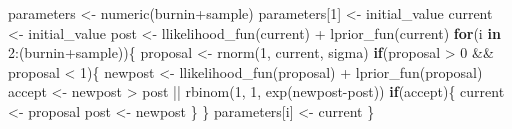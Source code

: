 \documentclass[
  12pt,
]{article}
\newenvironment{Shaded}{\begin{snugshade}}{\end{snugshade}}
\newcommand{\ControlFlowTok}[1]{\textcolor[rgb]{0.13,0.29,0.53}{\textbf{#1}}}
\newcommand{\DecValTok}[1]{\textcolor[rgb]{0.00,0.00,0.81}{#1}}
\newcommand{\FunctionTok}[1]{\textcolor[rgb]{0.00,0.00,0.00}{#1}}
\newcommand{\NormalTok}[1]{#1}
\newcommand{\OtherTok}[1]{\textcolor[rgb]{0.56,0.35,0.01}{#1}}
\newcommand{\SpecialCharTok}[1]{\textcolor[rgb]{0.00,0.00,0.00}{#1}}
\begin{document}
\begin{Shaded}
\begin{Highlighting}[]
\NormalTok{  parameters }\OtherTok{\textless{}{-}} \FunctionTok{numeric}\NormalTok{(burnin}\SpecialCharTok{+}\NormalTok{sample)}
\NormalTok{  parameters[}\DecValTok{1}\NormalTok{] }\OtherTok{\textless{}{-}}\NormalTok{ initial\_value}
\NormalTok{  current }\OtherTok{\textless{}{-}}\NormalTok{ initial\_value}
\NormalTok{  post }\OtherTok{\textless{}{-}} \FunctionTok{llikelihood\_fun}\NormalTok{(current) }\SpecialCharTok{+} \FunctionTok{lprior\_fun}\NormalTok{(current)}
  \ControlFlowTok{for}\NormalTok{(i }\ControlFlowTok{in} \DecValTok{2}\SpecialCharTok{:}\NormalTok{(burnin}\SpecialCharTok{+}\NormalTok{sample))\{}
\NormalTok{    proposal }\OtherTok{\textless{}{-}} \FunctionTok{rnorm}\NormalTok{(}\DecValTok{1}\NormalTok{, current, sigma)}
    \ControlFlowTok{if}\NormalTok{(proposal }\SpecialCharTok{\textgreater{}} \DecValTok{0} \SpecialCharTok{\&\&}\NormalTok{ proposal }\SpecialCharTok{\textless{}} \DecValTok{1}\NormalTok{)\{}
\NormalTok{      newpost }\OtherTok{\textless{}{-}} \FunctionTok{llikelihood\_fun}\NormalTok{(proposal) }\SpecialCharTok{+} \FunctionTok{lprior\_fun}\NormalTok{(proposal)}
\NormalTok{      accept }\OtherTok{\textless{}{-}}\NormalTok{ newpost }\SpecialCharTok{\textgreater{}}\NormalTok{ post }\SpecialCharTok{||} \FunctionTok{rbinom}\NormalTok{(}\DecValTok{1}\NormalTok{, }\DecValTok{1}\NormalTok{, }\FunctionTok{exp}\NormalTok{(newpost}\SpecialCharTok{{-}}\NormalTok{post))}
      \ControlFlowTok{if}\NormalTok{(accept)\{}
\NormalTok{        current }\OtherTok{\textless{}{-}}\NormalTok{ proposal}
\NormalTok{        post }\OtherTok{\textless{}{-}}\NormalTok{ newpost}
\NormalTok{      \}}
\NormalTok{    \}}
\NormalTok{    parameters[i] }\OtherTok{\textless{}{-}}\NormalTok{ current}
\NormalTok{  \}}
  

\end{Highlighting}
\end{Shaded}
\end{document}
